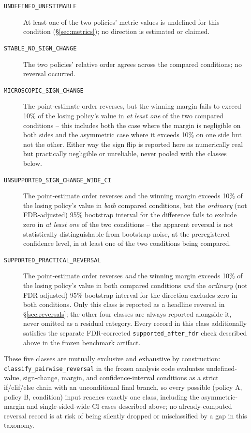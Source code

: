 \begin{description}
  \item[\texttt{UNDEFINED\_UNESTIMABLE}] At least one of the two policies'
    metric values is undefined for this condition (\S\ref{sec:metrics});
    no direction is estimated or claimed.
  \item[\texttt{STABLE\_NO\_SIGN\_CHANGE}] The two policies' relative order
    agrees across the compared conditions; no reversal occurred.
  \item[\texttt{MICROSCOPIC\_SIGN\_CHANGE}] The point-estimate order
    reverses, but the winning margin fails to exceed 10\% of the losing
    policy's value in \emph{at least one} of the two compared conditions --
    this includes both the case where the margin is negligible on both
    sides and the asymmetric case where it exceeds 10\% on one side but not
    the other. Either way the sign flip is reported here as numerically
    real but practically negligible or unreliable, never pooled with the
    classes below.
  \item[\texttt{UNSUPPORTED\_SIGN\_CHANGE\_WIDE\_CI}] The point-estimate
    order reverses and the winning margin exceeds 10\% of the losing
    policy's value in \emph{both} compared conditions, but the
    \emph{ordinary} (not FDR-adjusted) 95\% bootstrap interval for the
    difference fails to
    exclude zero in \emph{at least one} of the two conditions -- the
    apparent reversal is not statistically distinguishable from bootstrap
    noise, at the preregistered confidence level, in at least one of the
    two conditions being compared.
  \item[\texttt{SUPPORTED\_PRACTICAL\_REVERSAL}] The point-estimate order
    reverses \emph{and} the winning margin exceeds 10\% of the losing
    policy's value in both compared conditions \emph{and} the
    \emph{ordinary} (not FDR-adjusted) 95\% bootstrap interval for the
    direction excludes zero
    in both conditions. Only this class is reported as a headline reversal
    in \S\ref{sec:reversals}; the other four classes are always reported
    alongside it, never omitted as a residual category. Every record in
    this class additionally satisfies the separate FDR-corrected
    \texttt{supported\_after\_fdr} check described above in the frozen
    benchmark artifact.
\end{description}

These five classes are mutually exclusive and exhaustive by construction:
\texttt{classify\_pairwise\_reversal} in the frozen analysis code evaluates
undefined-value, sign-change, margin, and confidence-interval conditions as
a strict if/elif/else chain with an unconditional final branch, so every
possible (policy A, policy B, condition) input reaches exactly one class,
including the asymmetric-margin and single-sided-wide-CI cases described
above; no already-computed reversal record is at risk of being silently
dropped or misclassified by a gap in this taxonomy.

